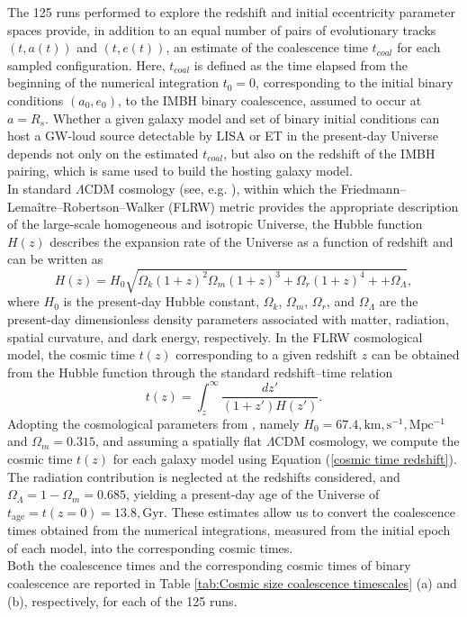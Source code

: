 \documentclass[12pt,twoside,openany]{book}
\begin{document}
The 125 runs performed to explore the redshift and initial eccentricity parameter spaces provide, in addition to an equal number of pairs of evolutionary tracks $(t,a(t))$ and $(t,e(t))$, an estimate of the coalescence time $t_{coal}$ for each sampled configuration. Here, $t_{coal}$ is defined as the time elapsed from the beginning of the numerical integration $t_0=0$, corresponding to the initial binary conditions $(a_0,e_0)$, to the IMBH binary coalescence, assumed to occur at $a=R_s$. Whether a given galaxy model and set of binary initial conditions can host a GW-loud source detectable by LISA or ET in the present-day Universe depends not only on the estimated $t_{coal}$, but also on the redshift of the IMBH pairing, which is same used to build the hosting galaxy model.\\In standard $\Lambda$CDM  cosmology (see, e.g. \citealt{Coles_book}), within which the Friedmann--Lemaître--Robertson--Walker (FLRW) metric provides the appropriate description of the large-scale homogeneous and isotropic Universe, the Hubble function $H(z)$ describes the expansion rate of the Universe as a function of redshift and can be written as
\begin{equation}
    H(z) = H_0 \sqrt{\Omega_{k}(1+z)^2\Omega_{m}(1+z)^3 + \Omega_{r}(1+z)^4 +  + \Omega_{\Lambda}},
    \label{Hubble function}
\end{equation}
where $H_0$ is the present-day Hubble constant, $\Omega_{k}$, $\Omega_{m}$, $\Omega_{r}$, and $\Omega_{\Lambda}$ are the present-day dimensionless density parameters associated with matter, radiation, spatial curvature, and dark energy, respectively. In the FLRW cosmological model, the cosmic time $t(z)$ corresponding to a given redshift $z$ can be obtained from the Hubble function through the standard redshift--time relation
\begin{equation}
    t(z) = \int_z^\infty \frac{dz'}{(1+z')H(z')}.
    \label{cosmic time redshift}
\end{equation}
Adopting the cosmological parameters from \textcite{PLANK_2020}, namely $H_0=67.4,\mathrm{km,s^{-1},Mpc^{-1}}$ and $\Omega_m=0.315$, and assuming a spatially flat $\Lambda$CDM cosmology, we compute the cosmic time $t(z)$ for each galaxy model using Equation (\ref{cosmic time redshift}). The radiation contribution is neglected at the redshifts considered, and $\Omega_\Lambda=1-\Omega_m=0.685$, yielding a present-day age of the Universe of $t_{\mathrm{age}}=t(z=0)=13.8,\mathrm{Gyr}$. These estimates allow us to convert the coalescence times obtained from the numerical integrations, measured from the initial epoch of each model, into the corresponding cosmic times.\\Both the coalescence times and the corresponding cosmic times of binary coalescence are reported in Table \ref{tab:Cosmic size coalescence timescales} (a) and (b), respectively, for each of the 125 runs.
\end{document}
